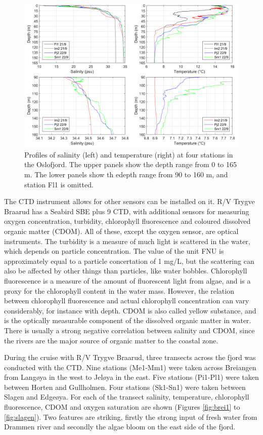 \documentclass[12pt,a4paper,english]{article}
\begin{document}
\begin{figure}[ht]
\centerline{
\includegraphics*[width=\textwidth]{Figurer/Fig_profiles.png}}
\caption{\small
Profiles of salinity (left) and temperature (right) at four stations in the 
Oslofjord. The upper panels show the depth range from 0 to 165 m.
The lower panels show th edepth range from 90 to 160 m, and station Fl1 is omitted.
}
\label{fig:profiles}
\end{figure}

The CTD instrument allows for other sensors can be installed on it. 
R/V Trygve Braarud has a Seabird SBE plus 9 CTD, 
with additional sensors for measuring oxygen concentration, turbidity, 
chlorophyll fluorescence and coloured dissolved organic matter (CDOM). 
All of these, except the oxygen sensor, are optical instruments. 
The turbidity is a measure of much light is scattered in the water, 
which depends on particle concentration. The value of the unit FNU is 
approximately equal to a particle concertation of 1 mg/L, 
but the scattering can also be affected by other things than particles, 
like water bobbles. Chlorophyll fluorescence is a measure of the amount 
of fluorescent light from algae, and is a proxy for the chlorophyll content 
in the water mass. However, the relation between chlorophyll fluorescence 
and actual chlorophyll concentration can vary considerably, 
for instance with depth. 
CDOM is also called yellow substance, and is the optically measurable 
component of the dissolved organic matter in water. 
There is usually a strong negative correlation between salinity and CDOM, 
since the rivers are the major source of organic matter to the coastal zone. 

During the cruise with R/V Trygve Braarud, three transects 
across the fjord was conducted with the CTD. Nine stations (Me1-Mm1) were taken 
across Breiangen from Lang{\o}ya in the west to Jel{\o}ya in the east. 
Five stations (Pi1-Pl1) were taken between Horten and Gullholmen. 
Four stations (Sk1-Sn1) were taken between Slagen and Edge{\o}ya. 
For each of the transect salinity, temperature, chlorophyll fluorescence, 
CDOM and oxygen saturation are shown (Figures \ref{fig:brei1} to \ref{fig:slagen}). 
Two features are striking, 
firstly the strong input of fresh water from Drammen river and secondly the algae bloom on the east side of the fjord.
\end{document}
